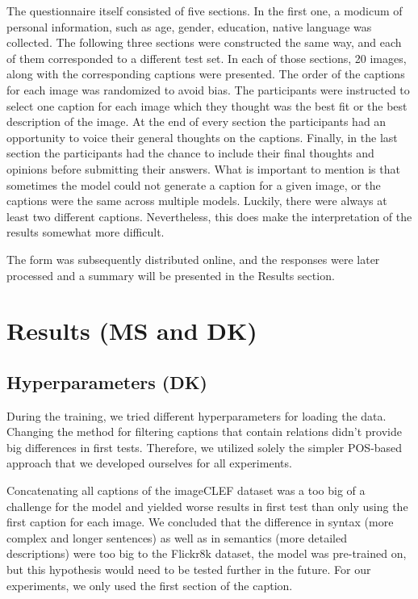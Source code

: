 \documentclass[11pt]{article}
\begin{document}
The questionnaire itself consisted of five sections. In the first one, a modicum of personal information, such as age, gender, education, native language was collected. The following three sections were constructed the same way, and each of them corresponded to a different test set. In each of those sections, 20 images, along with the corresponding captions were presented. The order of the captions for each image was randomized to avoid bias. The participants were instructed to select one caption for each image which they thought was the best fit or the best description of the image. At the end of every section the participants had an opportunity to voice their general thoughts on the captions. Finally, in the last section the participants had the chance to include their final thoughts and opinions before submitting their answers. What is important to mention is that sometimes the model could not generate a caption for a given image, or the captions were the same across multiple models. Luckily, there were always at least two different captions. Nevertheless, this does make the interpretation of the results somewhat more difficult.

The form was subsequently distributed online, and the responses were later processed and a summary will be presented in the Results section.

\section{Results (MS and DK)}

\subsection{Hyperparameters (DK)}

During the training, we tried different hyperparameters for loading the data. Changing the method for filtering captions that contain relations didn't provide big differences in first tests. Therefore, we utilized solely the simpler POS-based approach that we developed ourselves for all experiments.

Concatenating all captions of the imageCLEF dataset was a too big of a challenge for the model and yielded worse results in first test than only using the first caption for each image. We concluded that the difference in syntax (more complex and longer sentences) as well as in semantics (more detailed descriptions) were too big to the Flickr8k dataset, the model was pre-trained on, but this hypothesis would need to be tested further in the future. For our experiments, we only used the first section of the caption.
\end{document}
